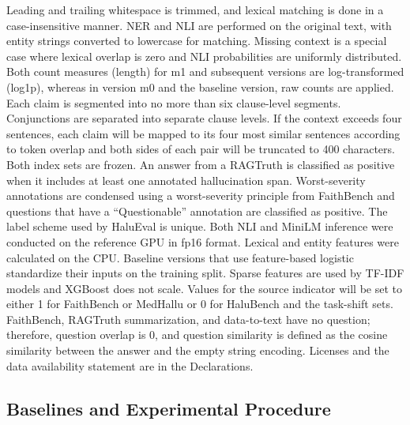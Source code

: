 \documentclass[a4paper,fleqn]{cas-sc}
\begin{document}
Leading and trailing whitespace is trimmed, and lexical matching is done in a case-insensitive manner. NER and NLI are performed on the original text, with entity strings converted to lowercase for matching. Missing context is a special case where lexical overlap is zero and NLI probabilities are uniformly distributed. Both count measures (length) for m1 and subsequent versions are log-transformed (log1p), whereas in version m0 and the baseline version, raw counts are applied. Each claim is segmented into no more than six clause-level segments. Conjunctions are separated into separate clause levels. If the context exceeds four sentences, each claim will be mapped to its four most similar sentences according to token overlap and both sides of each pair will be truncated to 400 characters. Both index sets are frozen. An answer from a RAGTruth is classified as positive when it includes at least one annotated hallucination span. Worst-severity annotations are condensed using a worst-severity principle from FaithBench and questions that have a ``Questionable'' annotation are classified as positive. The label scheme used by HaluEval is unique. Both NLI and MiniLM inference were conducted on the reference GPU in fp16 format. Lexical and entity features were calculated on the CPU. Baseline versions that use feature-based logistic standardize their inputs on the training split. Sparse features are used by TF-IDF models and XGBoost does not scale. Values for the source indicator will be set to either 1 for FaithBench or MedHallu or 0 for HaluBench and the task-shift sets. FaithBench, RAGTruth summarization, and data-to-text have no question; therefore, question overlap is 0, and question similarity is defined as the cosine similarity between the answer and the empty string encoding. Licenses and the data availability statement are in the Declarations.

\subsection{Baselines and Experimental Procedure}
\end{document}
